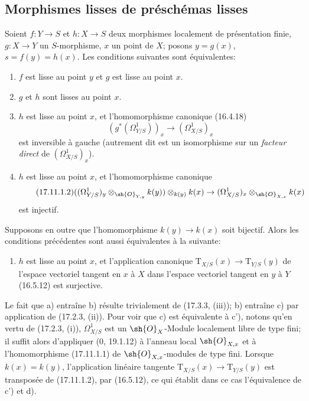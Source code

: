 \subsection{Morphismes lisses de préschémas lisses}

\begin{theorem}[17.11.1]
\label{IV.17.11.1}
Soient $f:Y\to S$ et $h:X\to S$ deux morphismes localement de présentation finie, $g:X\to Y$ un $S$-morphisme, $x$ un point de $X$; posons $y=g(x)$, $s=f(y)=h(x)$. Les conditions suivantes sont équivalentes:
\begin{enumerate}
  \item[a)] $f$ est lisse au point $y$ et $g$ est lisse au point $x$.
  \item[b)] $g$ et $h$ sont lisses au point $x$.
  \item[c)] $h$ est lisse au point $x$, et l'homomorphisme canonique (16.4.18)
  \begin{equation}
  \label{IV.17.11.1.1}
  \tag{17.11.1.1}
  (g^*(\Omega^1_{Y/S}))_x\to(\Omega^1_{X/S})_x
  \end{equation}
  est inversible à gauche (autrement dit est un isomorphisme sur un \emph{facteur direct} de $(\Omega^1_{X/S})_x$).
  \item[c')] $h$ est lisse au point $x$, et l'homomorphisme canonique
  \begin{equation}
  \label{IV.17.11.1.2}
  \tag{17.11.1.2}
  ((\Omega^1_{Y/S})_y\otimes_{\sh{O}_{Y,y}}k(y))\otimes_{k(y)}k(x)\to(\Omega^1_{X/S})_x\otimes_{\sh{O}_{X,x}}k(x)
  \end{equation}
  est injectif.
\end{enumerate}
Supposons en outre que l'homomorphisme $k(y)\to k(x)$ soit bijectif. Alors les conditions précédentes sont aussi équivalentes à la suivante:
\begin{enumerate}
  \item[d)] $h$ est lisse au point $x$, et l'application canonique $\mathrm{T}_{X/S}(x)\to\mathrm{T}_{Y/S}(y)$ de l'espace vectoriel tangent en $x$ à $X$ dans l'espace vectoriel tangent en $y$ à $Y$ (16.5.12) est surjective.
\end{enumerate}
\end{theorem}

Le fait que a) entraîne b) résulte trivialement de (17.3.3, (iii)); b) entraîne c) par application de (17.2.3, (ii)). Pour voir que c) est équivalente à c'), notons qu'en vertu de (17.2.3, (i)), $\Omega^1_{X/S}$ est un $\sh{O}_X$-Module localement libre de type fini; il suffit alors d'appliquer (0, 19.1.12) à l'anneau local $\sh{O}_{X,x}$ et à l'homomorphisme (17.11.1.1) de $\sh{O}_{X,x}$-modules de type fini. Lorsque $k(x)=k(y)$, l'application linéaire tangente $\mathrm{T}_{X/S}(x)\to\mathrm{T}_{Y/S}(y)$ est transposée de (17.11.1.2), par (16.5.12), ce qui établit dans ce cas l'équivalence de c') et d).

